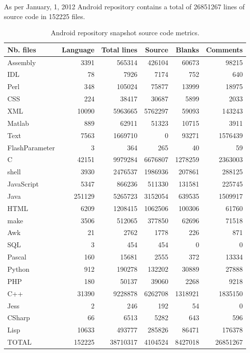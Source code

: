 \documentclass[a4paper,10pt]{article}
\numberwithin{equation}{subsection}
\begin{document}
As per January, 1, 2012 Android repository contains a total of 26851267 lines of source code in 
152225 files. 

\begin{table}
  \caption{Android repository snapshot source code metrics.}
  \begin{tabularx}{\textwidth}{ | X | r | r | r | r | r |}
  \hline                       
  Nb. files & Language & Total lines & Source & Blanks & Comments \\
  \hline 
  Assembly &3391 & 565314 & 426104 & 60673 & 98215 \\
  IDL & 78 & 7926 & 7174 & 752 & 640 \\
 Perl & 348 & 105024 & 75877 & 13999 & 18975 \\    
  CSS & 224 & 38417 & 30687 & 5899 & 2033 \\
  XML & 10090 & 5963665 & 5762297 & 59093 & 143243 \\   
  Matlab & 889 & 62911 & 51323 & 10715 & 3911 \\
  Text & 7563 & 1669710 & 0 & 93271 & 1576439 \\
  FlashParameter & 3 & 364 & 265 & 40 & 59 \\
  C & 42151 & 9979284 & 6676807 & 1278259 & 2363003 \\   
  shell & 3930 & 2476537 & 1986936 & 207861 & 288125 \\  
  JavaScript & 5347 & 866236 & 511330 & 131581 & 225745 \\   
  Java & 251129 & 5265723 & 3152054 & 639535 & 1509917 \\
  HTML & 6209 & 1208415 & 1062506 & 100306 & 61760 \\
  make & 3506 & 512065 & 377850 & 62696 & 71518 \\
  Awk & 21 & 2762 & 1778 & 226 & 871 \\
  SQL & 3 & 454 & 454 & 0 & 0 \\
  Pascal & 160 & 15681 & 2555 & 372 & 13334 \\      
  Python & 912 & 190278 & 132202 & 30889 & 27888 \\ 
  PHP & 180 & 50137 & 39060 & 2268 & 9218 \\
  C++ & 31390 & 9228878 & 6262708 & 1318921 & 1835150 \\   
  Jess & 2 & 246 & 192 & 54 & 0 \\
  CSharp & 66 & 6513 & 5282 & 643 & 596 \\      
  Lisp & 10633 & 493777 & 285826 & 86471 & 176378 \\
  \hline     
  TOTAL & 152225 & 38710317 & 4104524 & 8427018 & 26851267 \\    
  \hline  
  \end{tabularx}
\end{table}
\end{document}
